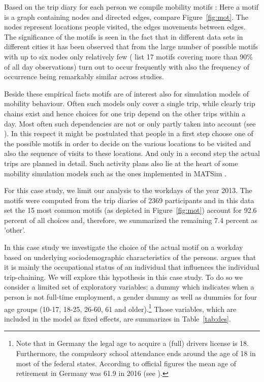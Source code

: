 \documentclass[12pt, a4paper]{article}
\numberwithin{defcounter}{section}
\numberwithin{excounter}{section}
\begin{document}
Based on the trip diary for each person we compile mobility motifs 
\citep{schneider2013}: Here a motif is a graph containing nodes and directed 
edges, compare Figure~\ref{fig:mot}. The nodes represent locations people visited, the edges movements between 
edges. The significance of the motifs is seen in the fact that in different data 
sets in different cities it has been observed that from the large number of 
possible motifs with up to six nodes only relatively few (\citep{schneider2013} list 17 motifs covering more than 90\% of all day observations) turn 
out to occur frequently with also the frequency of occurrence being remarkably 
similar across studies. 

Beside these empirical facts motifs are of interest also for simulation models of 
mobility behaviour. Often such models only cover a single trip, while clearly trip chains 
exist and hence choices for one trip depend on the other trips within a day. 
Most often such dependencies are not or only partly taken into account (see \citep[p. 219ff]{cascetta2009}). In this respect it might be postulated that people in a first step choose one of the possible motifs in order to decide on the various locations to be visited and also the sequence of visits to these locations. And only in a second step the actual trips are planned in detail. Such activity plans also lie at the heart of 
some mobility simulation models such as the ones implemented in MATSim \citep{Axhausen2016}. 

For this case study, we  limit our analysis to the workdays of the year 2013. The motifs were computed from the trip diaries of 2369 participants and in this data set the 15 most common motifs (as depicted in Figure~\ref{fig:mot}) account for 92.6 percent of all choices and, therefore, we summarized the remaining 7.4 percent as 'other'.  

In this case study we investigate the choice of the actual motif on a workday based on underlying sociodemographic characteristics of the persons. 
\cite{cascetta2009} argues that it is mainly the occupational status of an individual that influences the individual trip-chaining. 
We will explore this hypothesis in this case study. To do so we consider a limited set of exploratory variables: a dummy which indicates when a person is not full-time employment, 
a gender dummy as well as dummies for four age groups (10-17, 18-25, 26-60, 61 and older).\footnote{Note that in Germany the legal age to acquire a (full) drivers license is 18. Furthermore, the compulsory school attendance ends around the age of 18 in most of the federal states. According to official figures the mean age of retirement in Germany was 61.9 in 2016 (see \citep{DRV2016}).} Those variables, which are included in the model as fixed effects, are summarizes in Table~\ref{tab:des}. 
\end{document}
